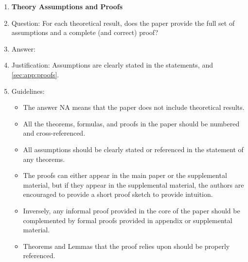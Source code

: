 \documentclass{article}
\theoremstyle{plain}
\theoremstyle{definition}
\theoremstyle{remark}
\theoremstyle{remark}
\begin{document}
\begin{enumerate}
\item {\bf Theory Assumptions and Proofs}
    \item[] Question: For each theoretical result, does the paper provide the full set of assumptions and a complete (and correct) proof?
    \item[] Answer: \answerYes{} %
    \item[] Justification: Assumptions are clearly stated in the statements, and \autoref{sec:app:proofs}.
    \item[] Guidelines:
    \begin{itemize}
        \item The answer NA means that the paper does not include theoretical results. 
        \item All the theorems, formulas, and proofs in the paper should be numbered and cross-referenced.
        \item All assumptions should be clearly stated or referenced in the statement of any theorems.
        \item The proofs can either appear in the main paper or the supplemental material, but if they appear in the supplemental material, the authors are encouraged to provide a short proof sketch to provide intuition. 
        \item Inversely, any informal proof provided in the core of the paper should be complemented by formal proofs provided in appendix or supplemental material.
        \item Theorems and Lemmas that the proof relies upon should be properly referenced. 
    \end{itemize}


\end{enumerate}
\end{document}

